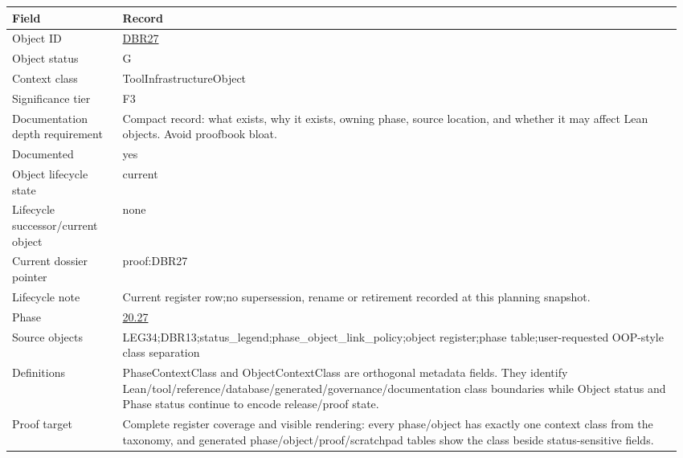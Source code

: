 \begin{longtable}{L{0.16\linewidth} L{0.81\linewidth}}
\hline
\textbf{Field} & \textbf{Record}\\
\hline
Object ID & \hyperlink{object-row-DBR27}{DBR27}\\
\hline\addlinespace[0.20em]
Object status & G\\
\hline\addlinespace[0.20em]
Context class & ToolInfrastructureObject\\
\hline\addlinespace[0.20em]
Significance tier & F3\\
\hline\addlinespace[0.20em]
Documentation depth requirement & Compact record: what exists, why it exists, owning phase, source location, and whether it may affect Lean objects. Avoid proofbook bloat.\\
\hline\addlinespace[0.20em]
Documented & yes\\
\hline\addlinespace[0.20em]
Object lifecycle state & current\\
\hline\addlinespace[0.20em]
Lifecycle successor/\allowbreak{}current object & none\\
\hline\addlinespace[0.20em]
Current dossier pointer & proof:DBR27\\
\hline\addlinespace[0.20em]
Lifecycle note & Current register row;\newline no supersession, rename or retirement recorded at this planning snapshot.\\
\hline\addlinespace[0.20em]
Phase & \hyperlink{phase-row-20-27}{20.27}\\
\hline\addlinespace[0.20em]
Source objects & LEG34;\newline DBR13;\newline status\_legend;\newline phase\_object\_link\_policy;\newline object register;\newline phase table;\newline user-requested OOP-style class separation\\
\hline\addlinespace[0.20em]
Definitions & PhaseContextClass and ObjectContextClass are orthogonal metadata fields. They identify Lean/\allowbreak{}tool/\allowbreak{}reference/\allowbreak{}database/\allowbreak{}generated/\allowbreak{}governance/\allowbreak{}documentation class boundaries while Object status and Phase status continue to encode release/\allowbreak{}proof state.\\
\hline\addlinespace[0.20em]
Proof target & Complete register coverage and visible rendering: every phase/\allowbreak{}object has exactly one context class from the taxonomy, and generated phase/\allowbreak{}object/\allowbreak{}proof/\allowbreak{}scratchpad tables show the class beside status-sensitive fields.\\

\end{longtable}
